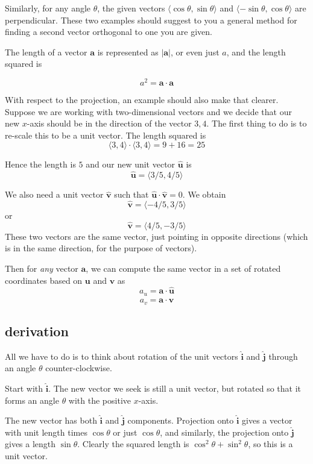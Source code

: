 \documentclass[11pt, oneside]{article}   	%
\begin{document}
Similarly, for any angle $\theta$, the given vectors $\langle \cos \theta, \sin \theta \rangle$ and $\langle -\sin \theta, \cos \theta \rangle$ are perpendicular.  These two examples should suggest to you a general method for finding a second vector orthogonal to one you are given.

The length of a vector $\mathbf{a}$ is represented as $|\mathbf{a}|$, or even just $a$, and the length squared is

\[ a^2 = \mathbf{a} \cdot \mathbf{a} \]

With respect to the projection, an example should also make that clearer.  Suppose we are working with two-dimensional vectors and we decide that our new $x$-axis should be in the direction of the vector $3,4$.  The first thing to do is to re-scale this to be a unit vector.  The length squared is
\[ \langle 3, 4 \rangle \cdot  \langle 3, 4 \rangle = 9 + 16 = 25 \]

Hence the length is $5$ and our new unit vector $\mathbf{\hat{u}}$ is 
\[ \mathbf{\hat{u}} = \langle 3/5, 4/5 \rangle \]

We also need a unit vector $\mathbf{\hat{v}}$ such that $\mathbf{\hat{u}} \cdot \mathbf{\hat{v}} = 0$.  We obtain
\[ \mathbf{\hat{v}} = \langle -4/5, 3/5 \rangle \]
or 
\[ \mathbf{\hat{v}} = \langle 4/5, -3/5 \rangle \]
These two vectors are the same vector, just pointing in opposite directions (which is in the same direction, for the purpose of vectors).

Then for \emph{any} vector $\mathbf{a}$, we can compute the same vector in a set of rotated coordinates based on $\mathbf{u}$ and $\mathbf{v}$ as
\[ a_u = \mathbf{a} \cdot \mathbf{\hat{u}} \]
\[ a_v = \mathbf{a} \cdot \mathbf{\hat{v}} \]

\subsection*{derivation}

All we have to do is to think about rotation of the unit vectors $\hat{\mathbf{i}}$ and $\hat{\mathbf{j}}$ through an angle $\theta$ counter-clockwise.  

Start with $\hat{\mathbf{i}}$.  The new vector we seek is still a unit vector, but rotated so that it forms an angle $\theta$ with the positive $x$-axis.

The new vector has both $\hat{\mathbf{i}}$ and $\hat{\mathbf{j}}$ components. Projection onto $\hat{\mathbf{i}}$ gives a vector with unit length times $\cos \theta$ or just $\cos \theta$, and similarly, the projection onto $\hat{\mathbf{j}}$ gives a length $\sin \theta$.  Clearly the squared length is $\cos^2 \theta + \sin^2 \theta$, so this is a unit vector.
\end{document}
